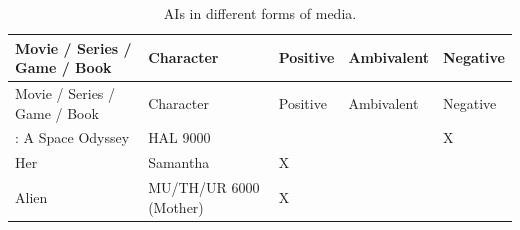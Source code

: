 \documentclass[
  12pt,
  letterpaper,
  DIV=11,
  numbers=noendperiod]{scrartcl}
\begin{document}
\def\pandoctableshortcapt{AIs in Different Forms of Media}

\begin{longtable}[]{@{}
  >{\raggedright\arraybackslash}p{}
  >{\raggedright\arraybackslash}p{}
  >{\raggedright\arraybackslash}p{}
  >{\raggedright\arraybackslash}p{}
  >{\raggedright\arraybackslash}p{}@{}}
\caption[AIs in Different Forms of Media]{AIs in different forms of
media.}\tabularnewline
\toprule\noalign{}
\begin{minipage}[b]{\linewidth}\raggedright
Movie / Series / Game / Book
\end{minipage} & \begin{minipage}[b]{\linewidth}\raggedright
Character
\end{minipage} & \begin{minipage}[b]{\linewidth}\raggedright
Positive
\end{minipage} & \begin{minipage}[b]{\linewidth}\raggedright
Ambivalent
\end{minipage} & \begin{minipage}[b]{\linewidth}\raggedright
Negative
\end{minipage} \\
\midrule\noalign{}
\endfirsthead
\toprule\noalign{}
\begin{minipage}[b]{\linewidth}\raggedright
Movie / Series / Game / Book
\end{minipage} & \begin{minipage}[b]{\linewidth}\raggedright
Character
\end{minipage} & \begin{minipage}[b]{\linewidth}\raggedright
Positive
\end{minipage} & \begin{minipage}[b]{\linewidth}\raggedright
Ambivalent
\end{minipage} & \begin{minipage}[b]{\linewidth}\raggedright
Negative
\end{minipage} \\
\midrule\noalign{}
\endhead
\bottomrule\noalign{}
\endlastfoot
2001: A Space Odyssey & HAL 9000 & & & X \\
Her & Samantha & X & & \\
Alien & MU/TH/UR 6000 (Mother) & X & & \\

\end{longtable}
\end{document}
